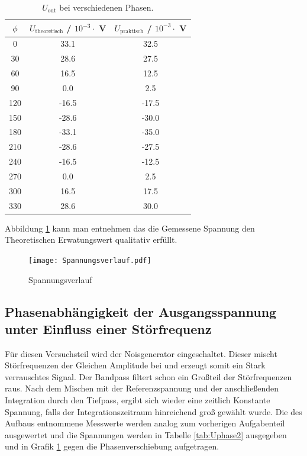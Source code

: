 \begin{table}
  \centering
  \begin{tabular}{c c c}
    \toprule
    $\phi$ & $U_{\text{theoretisch}}$ / $10^{-3} \cdot $ V & $U_{\text{praktisch}}$ / $10^{-3} \cdot $ V \\
    \midrule
    0	  &  33.1  &  32.5	\\
    30	&  28.6  &  27.5	\\
    60	&  16.5  &  12.5	\\
    90	&  0.0 	 &   2.5	\\
    120	& -16.5  & -17.5	\\
    150	& -28.6  & -30.0	\\
    180	& -33.1  & -35.0	\\
    210	& -28.6  & -27.5	\\
    240	& -16.5  & -12.5	\\
    270	&  0.0 	 &  2.5	 	\\
    300	&  16.5  &  17.5	\\
    330	&  28.6	 &  30.0	\\
  \end{tabular}
  \caption{$U_{\text{out}}$ bei verschiedenen Phasen.}
  \label{tab:Uphase}
\end{table}
Abbildung \ref{fig:Spannungsverlauf} kann man entnehmen das die Gemessene Spannung den Theoretischen Erwatungswert qualitativ erfüllt.
\begin{figure}
  \centering
  \texttt{[image: Spannungsverlauf.pdf]}
  \caption{Spannungsverlauf}
  \label{fig:Spannungsverlauf}
\end{figure}
\subsection{Phasenabhängigkeit der Ausgangsspannung unter Einfluss einer Störfrequenz}
Für diesen Versuchsteil wird der Noisgenerator eingeschaltet. Dieser mischt Störfrequenzen der Gleichen Amplitude bei und erzeugt somit ein Stark verrauschtes Signal. Der Bandpass filtert schon ein Großteil der Störfrequenzen raus. Nach dem Mischen mit der Referenzspannung und der anschließenden Integration durch den Tiefpass, ergibt sich wieder eine zeitlich Konstante Spannung, falls der Integrationszeitraum hinreichend groß gewählt wurde. Die des Aufbaus entnommene Messwerte werden analog zum vorherigen Aufgabenteil ausgewertet und die Spannungen werden in Tabelle \ref{tab:Uphase2} ausgegeben und in Grafik \ref{fig:Spannungsverlauf} gegen die Phasenverschiebung aufgetragen.

